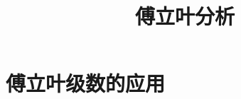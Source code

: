 \documentclass{book}
\begin{document}
\title{傅立叶分析}
\maketitle

\chapter{傅立叶级数的应用}


\cite{stein2003}


\end{document}
